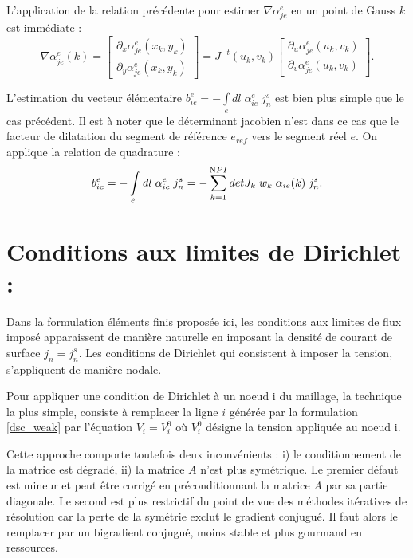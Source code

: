 \documentclass[a4paper, 11pt]{article}
\begin{document}
L'application de la relation précédente pour estimer $\nabla \alpha_{je}^e$ en un point de Gauss $k$ est immédiate :
\begin{equation}
\nabla \alpha_{je}^e(k)=
\begin{bmatrix}
    \partial_x \alpha_{je}^e (x_k, y_k)\\
    \partial_y \alpha_{je}^e (x_k, y_k) 
\end{bmatrix}
=
J^{-t}(u_k, v_k)
\begin{bmatrix}
    \partial_u \alpha_{je}^e(u_k, v_k)  \\
    \partial_v \alpha_{je}^e (u_k, v_k)
\end{bmatrix}.
\end{equation}

L'estimation du vecteur élémentaire $b_{ie}^e = - \int\limits_{e}  {dl\;} {\alpha _{ie}^e}\;j_n^s$ est bien plus simple que le cas précédent.
Il est à noter que le déterminant jacobien n'est dans ce cas que le facteur de dilatation du segment de référence $e_{ref}$
vers le segment réel $e$. On applique la relation de quadrature :
\begin{equation}
b_{ie}^e = - \int\limits_{e}  {dl\;} {\alpha _{ie}^e}\;j_n^s = - \sum_{k=1}^{\text NPI} detJ_k \; w_k \; \alpha_{ie}(k) \; j_n^s .
\end{equation}


\section{Conditions aux limites de Dirichlet :}

Dans la formulation éléments finis proposée ici, les conditions aux limites de flux imposé  apparaissent de manière naturelle en imposant la densité de courant de surface $j_n=j_n ^s$. 
Les conditions de Dirichlet qui consistent à imposer la tension, s'appliquent de manière nodale.

Pour appliquer une condition de Dirichlet à un noeud i du maillage,
la technique la plus simple, consiste à remplacer
la ligne $i$ générée par la formulation \eqref{dsc_weak} par l'équation $V_i=V_i^0$ où
$V_i^0$ désigne la tension appliquée au noeud i.

Cette approche comporte toutefois deux inconvénients : i) le conditionnement de la matrice
est dégradé, ii) la matrice $A$ n'est plus symétrique. Le premier défaut est mineur et peut être corrigé en 
préconditionnant la matrice $A$ par sa partie diagonale. Le second est plus restrictif du point
de vue des méthodes itératives de résolution  car la perte de la symétrie exclut  le gradient conjugué. 
Il faut alors le remplacer par un bigradient conjugué, moins stable et plus gourmand en ressources.
\end{document}
